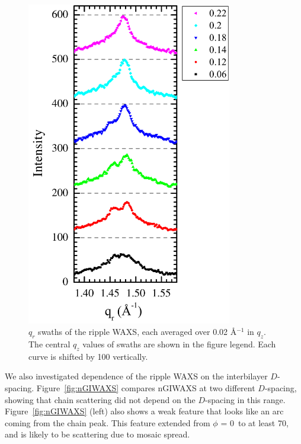\begin{figure}[htbp]
  \centering
  \includegraphics[width=0.8\textwidth]{figures/ripple/nGIWAXS/qrplots}
  \caption{$q_r$ swaths of the ripple WAXS, each averaged over 0.02 \AA$^{-1}$
  in $q_z$. 
  The central $q_z$ values of swaths are shown in the figure legend.  
  Each curve is shifted by 100 vertically. }
  \label{fig:qrplots}
\end{figure}

We also investigated dependence of the ripple WAXS on the interbilayer
$D$-spacing. Figure~\ref{fig:nGIWAXS} compares nGIWAXS at two different $D$-spacing,
showing that chain scattering did not depend on the $D$-spacing in this range. 
Figure~\ref{fig:nGIWAXS} (left) also shows a weak feature that looks like an 
arc coming from the chain peak. This feature extended
from $\phi$ = 0\textdegree\ to at least 70\textdegree, and
is likely to be scattering due to mosaic spread.

